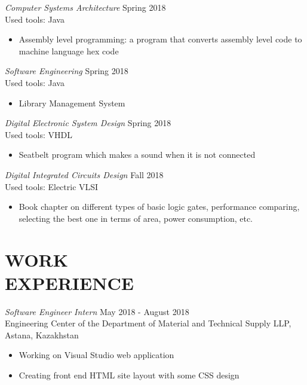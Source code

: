 \documentclass[margin, 10pt]{res} %
\begin{document}
\begin{resume}
{\sl Computer Systems Architecture} \hfill Spring 2018 \\
Used tools: Java
\begin{itemize}
\item Assembly level programming: a program that converts assembly level code to machine language hex code
\end{itemize} 

{\sl Software Engineering} \hfill Spring 2018 \\
Used tools: Java
\begin{itemize}
\item Library Management System
\end{itemize} 

{\sl Digital Electronic System Design} \hfill Spring 2018 \\
Used tools: VHDL
\begin{itemize}
\item Seatbelt program which makes a sound when it is not connected
\end{itemize} 

{\sl Digital Integrated Circuits Design} \hfill Fall 2018 \\
Used tools: Electric VLSI
\begin{itemize}
\item Book chapter on different types of basic logic gates, performance comparing, selecting the best one in terms of area, power consumption, etc.
\end{itemize} 

 
 
\section{WORK \\ EXPERIENCE}


{\sl Software Engineer Intern} \hfill May 2018 - August 2018 \\
Engineering Center of the Department of Material and Technical Supply LLP, Astana, Kazakhstan
\begin{itemize}
\item Working on Visual Studio web application
\item Creating front end HTML site layout with some CSS design
\end{itemize} 


\end{resume}
\end{document}
